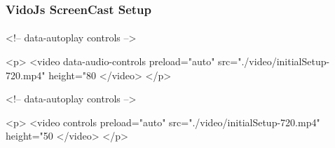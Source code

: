 \begin{frame}[fragile,label=VidoJsScreenCastSetup]
    \frametitle{VidoJs ScreenCast Setup}
    \framesubtitle{}


\begin{presentationMode}
\begin{htmlonly}
  \begin{rawhtml}
    <!-- data-autoplay  controls -->

    <p>
    <video  data-audio-controls   preload="auto"  src="./video/initialSetup-720.mp4"  height="80%
    </video>
    </p>
  \end{rawhtml}
\end{htmlonly}
\end{presentationMode}


\begin{articleMode}
\begin{htmlonly}
  \begin{rawhtml}
    <!-- data-autoplay  controls -->

    <p>
    <video controls  preload="auto"  src="./video/initialSetup-720.mp4"  height="50%
    </video>
    </p>
  \end{rawhtml}
\end{htmlonly}
\end{articleMode}


\end{frame}




\begin{comment}
*      ================
*  [[elisp:(org-cycle)][| ]] [[elisp:(org-show-subtree)][|=]] [[elisp:(show-children 10)][|V]] [[elisp:(bx:orgm:indirectBufOther)][|>]] [[elisp:(bx:orgm:indirectBufMain)][|I]] [[elisp:(blee:ppmm:org-mode-toggle)][|N]] [[elisp:(org-top-overview)][|O]] [[elisp:(progn (org-shifttab) (org-content))][|C]] [[elisp:(delete-other-windows)][|1]]  *Part 0*   /Using ByStar Content Publication Facilities/ ::  [[elisp:(org-cycle)][| ]]
\end{comment}

